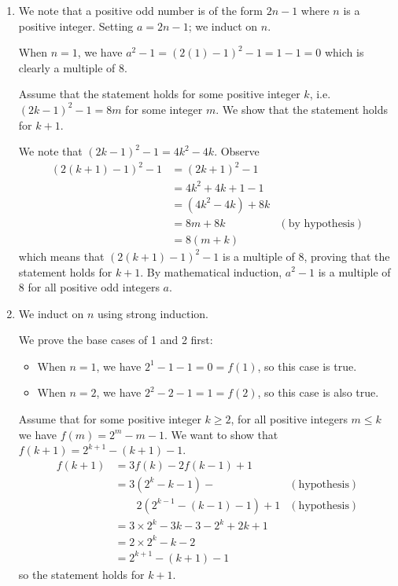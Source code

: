 \begin{enumerate}
    \item We note that a positive odd number is of the form $2n - 1$ where $n$ is a positive integer. Setting $a = 2n - 1$; we induct on $n$.
    
    When $n = 1$, we have $a^2 - 1 = (2(1) - 1)^2 - 1 = 1 - 1 = 0$ which is clearly a multiple of 8.
    
    Assume that the statement holds for some positive integer $k$, i.e. $(2k-1)^2 - 1 = 8m$ for some integer $m$. We show that the statement holds for $k + 1$.
    
    We note that $(2k-1)^2 - 1 = 4k^2 - 4k$. Observe
    \begin{align*}
        (2(k+1)-1)^2 - 1 &= (2k+1)^2 - 1\\
        &= 4k^2 + 4k + 1 - 1\\
        &= (4k^2 - 4k) + 8k\\
        &= 8m + 8k & (\text{by hypothesis})\\
        &= 8(m+k)
    \end{align*}
    which means that $(2(k+1)-1)^2 - 1$ is a multiple of 8, proving that the statement holds for $k+1$. By mathematical induction, $a^2 - 1$ is a multiple of 8 for all positive odd integers $a$.
    
    \item We induct on $n$ using strong induction.
    
    We prove the base cases of 1 and 2 first:
    \begin{itemize}
        \item When $n = 1$, we have $2^1 - 1 - 1 = 0 = f(1)$, so this case is true.
        \item When $n = 2$, we have $2^2 - 2 - 1 = 1 = f(2)$, so this case is also true.
    \end{itemize}
    
    Assume that for some positive integer $k \geq 2$, for all positive integers $m \leq k$ we have $f(m) = 2^m - m - 1$. We want to show that $f(k+1) = 2^{k+1} - (k+1) - 1$.
    \begin{align*}
        f(k+1) &= 3f(k) - 2f(k-1) + 1\\
        &= 3(2^k - k - 1) - & (\text{hypothesis})\\
        &\quad\quad2(2^{k-1} - (k-1) - 1) + 1 & (\text{hypothesis}) \\
        &= 3\times 2^k - 3k - 3 -2^k + 2k + 1\\
        &= 2\times2^k - k - 2\\
        &= 2^{k+1} - (k+1) - 1
    \end{align*}
    so the statement holds for $k+1$.
    

\end{enumerate}
